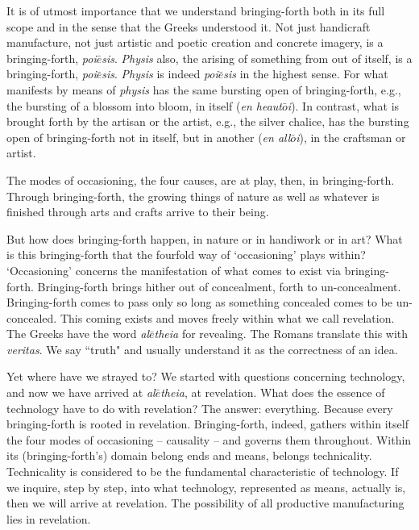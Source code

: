\documentclass[paper=a4, fontsize=11pt,twoside]{scrartcl}
\begin{document}
It is of utmost importance that we understand bringing-forth both in its full scope and in the sense that the Greeks understood it. Not just handicraft manufacture, not just artistic and poetic creation and concrete imagery, is a bringing-forth, \textit{poi$\bar{e}$sis}. \textit{Physis} also, the arising of something from out of itself, is a bringing-forth, \textit{poi$\bar{e}$sis}. \textit{Physis} is indeed \textit{poi$\bar{e}$sis} in the highest sense. For what manifests by means of \textit{physis} has the same bursting open of bringing-forth, e.g., the bursting of a blossom into bloom, in itself (\textit{en heaut$\bar{o}$i}). In contrast, what is brought forth by the artisan or the artist, e.g., the silver chalice, has the bursting open of bringing-forth not in itself, but in another (\textit{en all$\bar{o}$i}), in the craftsman or artist.

The modes of occasioning, the four causes, are at play, then, in bringing-forth. Through bringing-forth, the growing things of nature as well as whatever is finished through arts and crafts arrive to their being.

But how does bringing-forth happen, in nature or in handiwork or in art? What is this bringing-forth that the fourfold way of `occasioning' plays within? `Occasioning' concerns the manifestation of what comes to exist via bringing-forth. Bringing-forth brings hither out of concealment, forth to un-concealment. Bringing-forth comes to pass only so long as something concealed comes to be un-concealed. This coming exists and moves freely within what we call revelation. The Greeks have the word \textit{al$\bar{e}$theia} for revealing. The Romans translate this with \textit{veritas}. We say ``truth" and usually understand it as the correctness of an idea.

\vspace{10mm}

Yet where have we strayed to? We started with questions concerning technology, and now we have arrived at \textit{al$\bar{e}$theia}, at revelation. What does the essence of technology have to do with revelation? The answer: everything. Because every bringing-forth is rooted in revelation. Bringing-forth, indeed, gathers within itself the four modes of occasioning -- causality -- and governs them throughout. Within its (bringing-forth's) domain belong ends and means, belongs technicality. Technicality is considered to be the fundamental characteristic of technology. If we inquire, step by step, into what technology, represented as means, actually is, then we will arrive at revelation. The possibility of all productive manufacturing lies in revelation.
\end{document}
